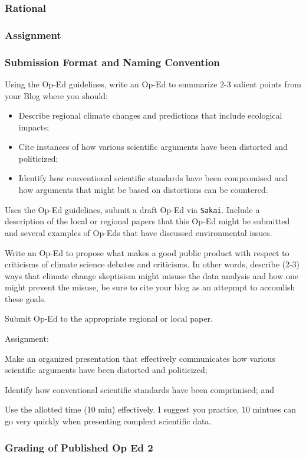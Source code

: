 
\subsubsection{Rational}

\subsubsection{Assignment}

\subsubsection{Submission Format and Naming Convention}

Using the Op-Ed guidelines, write an Op-Ed to summarize 2-3 salient points from your Blog where you should:

\begin{itemize}
  \item Describe regional climate changes and predictions that include ecological impacts; 
  \item Cite instances of how various scientific arguments have been distorted and politicized;
  \item Identify how conventional scientific standards have been compromised and how arguments that might be based on distortions can be countered.
\end{itemize}

Uses the Op-Ed guidelines, submit a draft Op-Ed via \texttt{Sakai}. Include a description of the local or regional papers that this Op-Ed might be submitted and several examples of Op-Eds that have discussed environmental issues.

Write an Op-Ed to propose what makes a good public product with respect to criticisms of climate science debates and criticisms. In other words, describe (2-3) ways that climate change skeptisism might misuse the data analysis and how one might prevent the misuse, be sure to cite your blog as an attepmpt to accomlish these goals. 

Submit Op-Ed to the appropriate regional or local paper.

\noindent Assignment: 
\begin{itemize*}
  \item Make an organized presentation that effectively communicates how various scientific arguments have been distorted and politicized;
  \item Identify how conventional scientific standards have been comprimised; and
  \item Use the allotted time (10 min) effectively. I suggest you practice, 10 mintues can go very quickly when presenting complext scientific data.
  
\end{itemize*}

\subsubsection{Grading of Published Op Ed 2}




